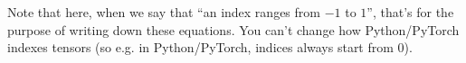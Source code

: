 \documentclass{article}
\newcommand{\W}{\mathbf{W}}
\newcommand{\p}{\mathbf{p}}
\begin{document}
Note that here, when we say that ``an index ranges from $-1$ to $1$'', that's for the purpose of writing down these equations.
You can't change how Python/PyTorch indexes tensors (so e.g. in Python/PyTorch, indices always start from $0$).


\end{document}
